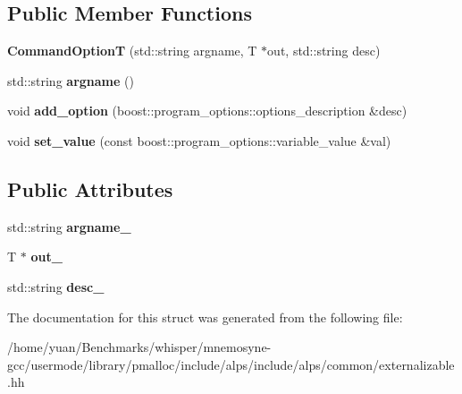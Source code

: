 \subsection*{Public Member Functions}
\begin{DoxyCompactItemize}
\item 
{\bfseries Command\+OptionT} (std\+::string argname, T $\ast$out, std\+::string desc)\hypertarget{structalps_1_1CommandOptionT_afeb7017b64f54b68d780ff44a669bb4b}{}\label{structalps_1_1CommandOptionT_afeb7017b64f54b68d780ff44a669bb4b}

\item 
std\+::string {\bfseries argname} ()\hypertarget{structalps_1_1CommandOptionT_adc65402419f6cb0161a027093b17f6c3}{}\label{structalps_1_1CommandOptionT_adc65402419f6cb0161a027093b17f6c3}

\item 
void {\bfseries add\+\_\+option} (boost\+::program\+\_\+options\+::options\+\_\+description \&desc)\hypertarget{structalps_1_1CommandOptionT_a960f8fc45f3f61b5769de59c955e2ab8}{}\label{structalps_1_1CommandOptionT_a960f8fc45f3f61b5769de59c955e2ab8}

\item 
void {\bfseries set\+\_\+value} (const boost\+::program\+\_\+options\+::variable\+\_\+value \&val)\hypertarget{structalps_1_1CommandOptionT_a05e50058ec74d24f799a7cfe311b39f0}{}\label{structalps_1_1CommandOptionT_a05e50058ec74d24f799a7cfe311b39f0}

\end{DoxyCompactItemize}
\subsection*{Public Attributes}
\begin{DoxyCompactItemize}
\item 
std\+::string {\bfseries argname\+\_\+}\hypertarget{structalps_1_1CommandOptionT_ae81a9788b7a13e96549630200234e1fe}{}\label{structalps_1_1CommandOptionT_ae81a9788b7a13e96549630200234e1fe}

\item 
T $\ast$ {\bfseries out\+\_\+}\hypertarget{structalps_1_1CommandOptionT_acb37d7fc0de3c05d142ca94b6284f368}{}\label{structalps_1_1CommandOptionT_acb37d7fc0de3c05d142ca94b6284f368}

\item 
std\+::string {\bfseries desc\+\_\+}\hypertarget{structalps_1_1CommandOptionT_a61c2aa354e9e80303f05f1c59172f9d6}{}\label{structalps_1_1CommandOptionT_a61c2aa354e9e80303f05f1c59172f9d6}

\end{DoxyCompactItemize}


The documentation for this struct was generated from the following file\+:\begin{DoxyCompactItemize}
\item 
/home/yuan/\+Benchmarks/whisper/mnemosyne-\/gcc/usermode/library/pmalloc/include/alps/include/alps/common/externalizable.\+hh\end{DoxyCompactItemize}
